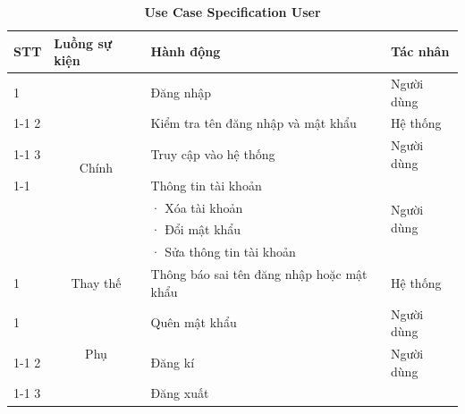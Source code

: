 \documentclass{article} %
\begin{document}
\begin{table}[H]
    \centering    
    \caption[Use Case Specification User]{\bfseries\fontsize{12pt}{0pt}\selectfont Use Case Specification User}
    \begin{tabular}{|l|c|l|l|}
        \hline
        \textbf{STT}       & \multicolumn{1}{l|}{Luồng sự kiện} & Hành động                                 & Tác nhân                    \\ \hline
        1                  & \multirow{7}{*}{Chính}             & Đăng nhập                                 & Người dùng                  \\ \cline{1-1} \cline{3-4} 
        2                  &                                    & Kiểm tra tên đăng nhập và mật khẩu        & Hệ thống                    \\ \cline{1-1} \cline{3-4} 
        3                  &                                    & Truy cập vào hệ thống                     & Người dùng                  \\ \cline{1-1} \cline{3-4} 
        \multirow{4}{*}{4} &                                    & Thông tin tài khoản                       & \multirow{4}{*}{Người dùng} \\
                           &                                    & ·       Xóa tài khoản                     &                             \\
                           &                                    & ·       Đổi mật khẩu                      &                             \\
                           &                                    & ·       Sửa thông tin tài khoản           &                             \\ \hline
        1                  & Thay thế                           & Thông báo sai tên đăng nhập hoặc mật khẩu & Hệ thống                    \\ \hline
        1                  & \multirow{3}{*}{Phụ}               & Quên mật khẩu                             & Người dùng                  \\ \cline{1-1} \cline{3-4} 
        2                  &                                    & Đăng kí                                   & Người dùng                  \\ \cline{1-1} \cline{3-4} 
        3                  &                                    & Đăng xuất                                 &                             \\ \hline
        \end{tabular}
    \label{tab:UCSUser}
\end{table}
\end{document}
